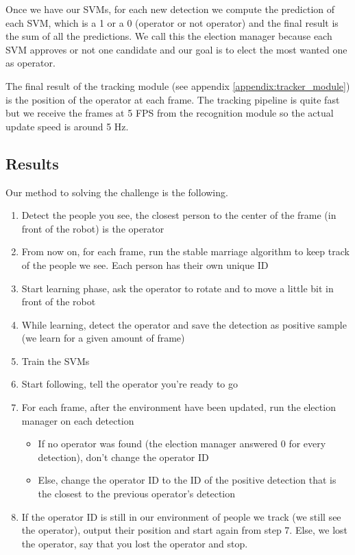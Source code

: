 \documentclass[a4paper, twocolumn]{article}
\begin{document}
    Once we have our SVMs, for each new detection we compute the prediction of each SVM, which is a 1 or a 0 (operator or not operator) and the final result is the sum of all the predictions. We call this the election manager because each SVM approves or not one candidate and our goal is to elect the most wanted one as operator.
    
    The final result of the tracking module (see appendix \ref{appendix:tracker_module}) is the position of the operator at each frame. The tracking pipeline is quite fast but we receive the frames at 5 FPS from the recognition module so the actual update speed is around 5 Hz.
    
    \subsection{Results}
    
    Our method to solving the challenge is the following.
    
    \begin{enumerate}
        \item Detect the people you see, the closest person to the center of the frame (in front of the robot) is the operator
        \item From now on, for each frame, run the stable marriage algorithm to keep track of the people we see. Each person has their own unique ID
        \item Start learning phase, ask the operator to rotate and to move a little bit in front of the robot
        \item While learning, detect the operator and save the detection as positive sample (we learn for a given amount of frame)
        \item Train the SVMs
        \item Start following, tell the operator you're ready to go
        \item For each frame, after the environment have been updated, run the election manager on each detection
        \begin{itemize}
            \item If no operator was found (the election manager answered 0 for every detection), don't change the operator ID
            \item Else, change the operator ID to the ID of the positive detection that is the closest to the previous operator's detection
        \end{itemize}
        \item If the operator ID is still in our environment of people we track (we still see the operator), output their position and start again from step 7. Else, we lost the operator, say that you lost the operator and stop.
    \end{enumerate}
    
\end{document}
